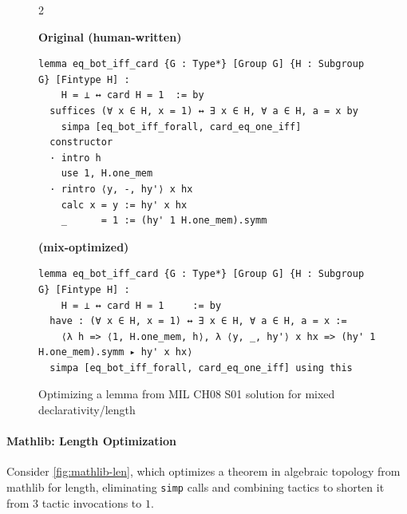 \setlength{\columnsep}{0.2cm}
\begin{figure}[ht]
\begin{multicols}{2}

{
\textbf{Original (human-written)}
\begin{scriptsize}
\begin{lstlisting}[basicstyle=\scriptsize\ttfamily]
lemma eq_bot_iff_card {G : Type*} [Group G] {H : Subgroup G} [Fintype H] :
    H = ⊥ ↔ card H = 1  := by
  suffices (∀ x ∈ H, x = 1) ↔ ∃ x ∈ H, ∀ a ∈ H, a = x by
    simpa [eq_bot_iff_forall, card_eq_one_iff]
  constructor
  · intro h
    use 1, H.one_mem
  · rintro ⟨y, -, hy'⟩ x hx
    calc x = y := hy' x hx
    _      = 1 := (hy' 1 H.one_mem).symm
\end{lstlisting}
\end{scriptsize}
}
\vfill\null
\columnbreak
{
\textbf{\methodname{} (mix-optimized)}
\begin{scriptsize}
\begin{lstlisting}[basicstyle=\scriptsize\ttfamily]
lemma eq_bot_iff_card {G : Type*} [Group G] {H : Subgroup G} [Fintype H] :
    H = ⊥ ↔ card H = 1     := by
  have : (∀ x ∈ H, x = 1) ↔ ∃ x ∈ H, ∀ a ∈ H, a = x :=
    ⟨λ h => ⟨1, H.one_mem, h⟩, λ ⟨y, _, hy'⟩ x hx => (hy' 1 H.one_mem).symm ▸ hy' x hx⟩
  simpa [eq_bot_iff_forall, card_eq_one_iff] using this
\end{lstlisting}
\end{scriptsize}
}
\end{multicols}
\vspace{-2.5em}
\caption{Optimizing a lemma from MIL CH08 S01 solution for mixed declarativity/length}
\label{fig:mil-mix}
\end{figure}


\vspace{15px}
\paragraph{Mathlib: Length Optimization} 

Consider \autoref{fig:mathlib-len}, which optimizes a theorem in algebraic topology from mathlib for length, eliminating \texttt{simp} calls and combining tactics to shorten it from $3$ tactic invocations to $1$.


